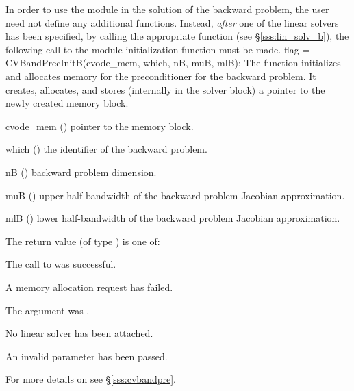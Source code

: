 In order to use the {\cvbandpre} module in the solution of the backward problem,
the user need not define any additional functions. 
Instead, {\em after} one of the {\cvspils} linear solvers has been specified,
by calling the appropriate function (see \S\ref{sss:lin_solv_b}), the following call
to the {\cvbandpre} module initialization function must be made.
{
  flag = CVBandPrecInitB(cvode\_mem, which, nB, muB, mlB);
}
{
  The function  initializes and allocates
  memory for the {\cvbandpre} preconditioner for the backward problem.
  It creates, allocates, and stores (internally in the {\cvodes} 
  solver block) a pointer to the newly created {\cvbandpre} memory block.
}
{
  \begin{args}
  \item[cvode\_mem] ()
    pointer to the {\cvodes} memory block.
  \item[which] ()
    the identifier of the backward problem.
  \item[nB] ()
    backward problem dimension.
  \item[muB] ()
    upper half-bandwidth of the backward problem Jacobian approximation.
  \item[mlB] ()
    lower half-bandwidth of the backward problem Jacobian approximation.
  \end{args}
}
{
  The return value  (of type ) is one of:
  \begin{args}
  \item[\Id{CVSPILS\_SUCCESS}]
    The call to  was successful.
  \item[\Id{CVSPILS\_MEM\_FAIL}]
    A memory allocation request has failed.
  \item[\Id{CVSPILS\_MEM\_NULL}]
    The  argument was .
  \item[\Id{CVSPILS\_LMEM\_NULL}]
    No linear solver has been attached.
  \item[\Id{CVSPILS\_ILL\_INPUT}]
    An invalid parameter has been passed.
  \end{args}
}
{}
For more details on {\cvbandpre} see \S\ref{sss:cvbandpre}.



